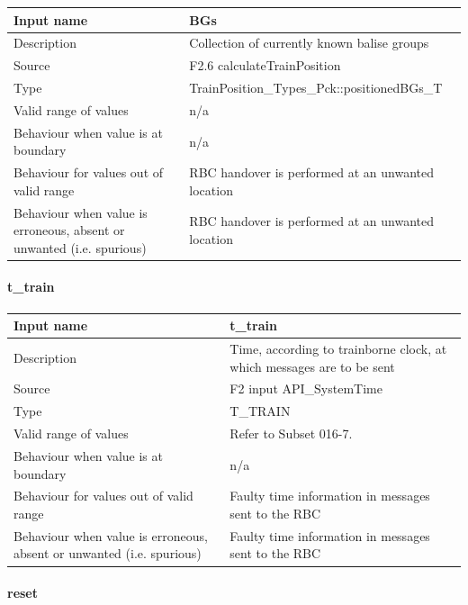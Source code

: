 \begin{longtable}{p{}p{}}
	\toprule
	Input name				& BGs \\
	\midrule
	Description				& Collection of currently known balise groups \\
	\midrule
	Source					& F2.6 calculateTrainPosition \\ 
	\midrule
	Type					& TrainPosition\_Types\_Pck::positionedBGs\_T \\
	\midrule
	Valid range of values	& n/a \\
	\midrule
	Behaviour when value is at boundary	& n/a \\
	\midrule
	Behaviour for values out of valid range	& RBC handover is performed at an unwanted location \\
	\midrule
	Behaviour when value is erroneous, absent or unwanted (i.e. spurious) & RBC handover is performed at an unwanted location \\
	\bottomrule
\end{longtable}

\paragraph{t\_train}

\begin{longtable}{p{}p{}}
	\toprule
	Input name				& t\_train \\
	\midrule
	Description				& Time, according to trainborne clock, at which messages are to be sent \\
	\midrule
	Source					& F2 input API\_SystemTime \\ 
	\midrule
	Type					& T\_TRAIN \\
	\midrule
	Valid range of values	& Refer to Subset 016-7. \\
	\midrule
	Behaviour when value is at boundary	& n/a \\
	\midrule
	Behaviour for values out of valid range	& Faulty time information in messages sent to the RBC \\
	\midrule
	Behaviour when value is erroneous, absent or unwanted (i.e. spurious) & Faulty time information in messages sent to the RBC \\
	\bottomrule
\end{longtable}

\paragraph{reset}

